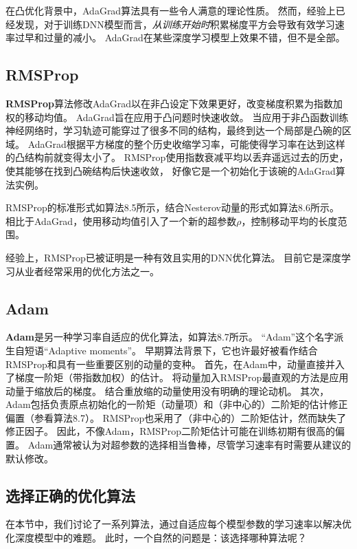 在凸优化背景中，AdaGrad算法具有一些令人满意的理论性质。
然而，经验上已经发现，对于训练\gls{DNN}模型而言，\emph{从训练开始时}积累梯度平方会导致有效学习速率过早和过量的减小。
AdaGrad在某些深度学习模型上效果不错，但不是全部。

\subsection{RMSProp}
\label{sec:rmsprop}
\textbf{RMSProp}算法\citep{Hinton-ipam2012}修改AdaGrad以在非凸设定下效果更好，改变梯度积累为指数加权的移动均值。
AdaGrad旨在应用于凸问题时快速收敛。
当应用于非凸函数训练神经网络时，学习轨迹可能穿过了很多不同的结构，最终到达一个局部是凸碗的区域。
AdaGrad根据平方梯度的整个历史收缩学习率，可能使得学习率在达到这样的凸结构前就变得太小了。
RMSProp使用指数衰减平均以丢弃遥远过去的历史，使其能够在找到凸碗结构后快速收敛，
好像它是一个初始化于该碗的AdaGrad算法实例。


RMSProp的标准形式如算法8.5所示，结合Nesterov动量的形式如算法8.6所示。
相比于AdaGrad，使用移动均值引入了一个新的超参数$\rho$，控制移动平均的长度范围。


经验上，RMSProp已被证明是一种有效且实用的\gls{DNN}优化算法。
目前它是深度学习从业者经常采用的优化方法之一。

\subsection{Adam}
\label{sec:adam}
\textbf{Adam}\citep{kingma2014adam}是另一种学习率自适应的优化算法，如算法8.7所示。
“Adam”这个名字派生自短语“Adaptive moments”。
早期算法背景下，它也许最好被看作结合RMSProp和具有一些重要区别的动量的变种。
首先，在Adam中，动量直接并入了梯度一阶矩（带指数加权）的估计。
将动量加入RMSProp最直观的方法是应用动量于缩放后的梯度。
结合重放缩的动量使用没有明确的理论动机。
其次，Adam包括负责原点初始化的一阶矩（动量项）和（非中心的）二阶矩的估计修正偏置（参看算法8.7）。
RMSProp也采用了（非中心的）二阶矩估计，然而缺失了修正因子。
因此，不像Adam，RMSProp二阶矩估计可能在训练初期有很高的偏置。
Adam通常被认为对超参数的选择相当鲁棒，尽管学习速率有时需要从建议的默认修改。


\subsection{选择正确的优化算法}
\label{sec:choosing_the_right_optimization_algorithms}
在本节中，我们讨论了一系列算法，通过自适应每个模型参数的学习速率以解决优化深度模型中的难题。
此时，一个自然的问题是：该选择哪种算法呢？

